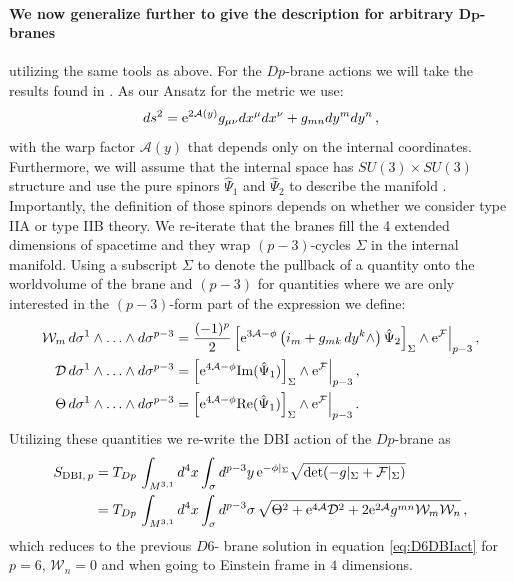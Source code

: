 \documentclass[a4paper,12pt,twoside,openright]{report}
\newcommand{\be}{\begin{equation}}
\newcommand{\ee}{\end{equation}}
\newcommand{\bea}{\begin{equation}\begin{aligned}}
\newcommand{\eea}{\end{aligned}\end{equation}}
\def\rme{{\rm e}}
\def\rmre{{\rm Re}}
\def\rmim{{\rm Im}}
\begin{document}
\paragraph{We now generalize further to give the description for arbitrary $\mathbf{Dp}$-branes} utilizing the same tools as above. For the $Dp$-brane actions we will take the results found in \cite{Martucci:2005ht,Martucci:2006ij}. As our Ansatz for the metric we use:
\be 
ds^2 = \rme^{2\mathcal{A}(y)} g_{\mu \nu} dx^\mu dx^\nu + g_{mn} dy^m dy^n \,,
\ee
with the warp factor $\mathcal{A}(y)$ that depends only on the internal coordinates. Furthermore, we will assume that the internal space has $SU(3)\times SU(3)$ structure and use the pure spinors $\hat{\Psi}_1$ and $\hat{\Psi}_2$ to describe the manifold \cite{Martucci:2005ht}. Importantly, the definition of those spinors depends on whether we consider type IIA or type IIB theory. We re-iterate that the branes fill the 4 extended dimensions of spacetime and they wrap $(p-3)$-cycles $\Sigma$ in the internal manifold. Using a subscript $\Sigma$ to denote the pullback of a quantity onto the worldvolume of the brane and $(p-3)$ for quantities where we are only interested in the $(p-3)$-form part of the expression we define:
\bea 
\mathcal{W}_m \, d\sigma^1 \wedge \ldots \wedge d\sigma^{p-3} &= \frac{(-1)^p}{2} \left[\rme^{3\mathcal{A}-\phi} \left( i_m + g_{mk}\,dy^k \wedge \right) \hat{\Psi}_2 \right]_\Sigma \wedge \rme^{\mathcal{F}}\Big|_{p-3}\,,\\
\mathcal{D} \, d\sigma^1 \wedge \ldots \wedge d\sigma^{p-3} &= \left[\rme^{4\mathcal{A}-\phi} \rmim(\hat{\Psi}_1)\right]_\Sigma \wedge \rme^{\mathcal{F}}\Big|_{p-3}\,,\\
\Theta \, d\sigma^1 \wedge \ldots \wedge d\sigma^{p-3} &= \left[\rme^{4\mathcal{A}-\phi} \rmre(\hat{\Psi}_1)\right]_\Sigma \wedge \rme^{\mathcal{F}}\Big|_{p-3}\,.
\eea 
Utilizing these quantities we re-write the DBI action of the $Dp$-brane as
\bea
S_{\text{DBI},\,p} &= T_{Dp} \, \int_{M^{3,1}} d^4x \int_\sigma d^{p-3}y \, \rme^{-\phi|_\Sigma} \sqrt{\det(-g|_\Sigma + \mathcal{F}|_\Sigma)}\\
&= T_{Dp} \, \int_{M^{3,1}} d^4x \int_\sigma d^{p-3}\sigma \, \sqrt{\Theta^2 + \rme^{4\mathcal{A}} \mathcal{D}^2 + 2 \rme^{2\mathcal{A}} g^{mn} \mathcal{W}_m \mathcal{W}_n}\,,
\eea
which reduces to the previous $D6$- brane solution in equation \eqref{eq:D6DBIact} for $p=6$, $\mathcal{W}_n = 0$ and when going to Einstein frame in $4$ dimensions.\\
\end{document}
